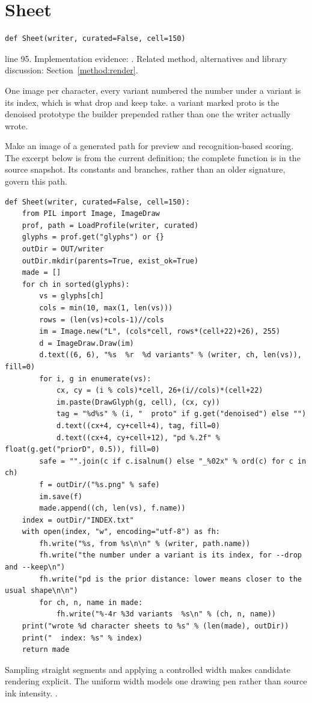 \section{Sheet}\label{fn:curate:Sheet}
\begin{lstlisting}[style=sig]
def Sheet(writer, curated=False, cell=150)
\end{lstlisting}
 line 95. Implementation evidence: \cite{code2026}. Related method, alternatives and library discussion: Section~\ref{method:render}.


One image per character, every variant numbered the number under a variant is its index, which is what drop and keep take.  a variant marked proto is the denoised prototype the builder prepended rather than one the writer actually wrote.


Make an image of a generated path for preview and recognition-based scoring. The excerpt below is from the current definition; the complete function is in the source snapshot. Its constants and branches, rather than an older signature, govern this path.


\begin{lstlisting}[style=plain]
def Sheet(writer, curated=False, cell=150):
    from PIL import Image, ImageDraw
    prof, path = LoadProfile(writer, curated)
    glyphs = prof.get("glyphs") or {}
    outDir = OUT/writer
    outDir.mkdir(parents=True, exist_ok=True)
    made = []
    for ch in sorted(glyphs):
        vs = glyphs[ch]
        cols = min(10, max(1, len(vs)))
        rows = (len(vs)+cols-1)//cols
        im = Image.new("L", (cols*cell, rows*(cell+22)+26), 255)
        d = ImageDraw.Draw(im)
        d.text((6, 6), "%s  %r  %d variants" % (writer, ch, len(vs)), fill=0)
        for i, g in enumerate(vs):
            cx, cy = (i % cols)*cell, 26+(i//cols)*(cell+22)
            im.paste(DrawGlyph(g, cell), (cx, cy))
            tag = "%d%s" % (i, "  proto" if g.get("denoised") else "")
            d.text((cx+4, cy+cell+4), tag, fill=0)
            d.text((cx+4, cy+cell+12), "pd %.2f" % float(g.get("priorD", 0.5)), fill=0)
        safe = "".join(c if c.isalnum() else "_%02x" % ord(c) for c in ch)
        f = outDir/("%s.png" % safe)
        im.save(f)
        made.append((ch, len(vs), f.name))
    index = outDir/"INDEX.txt"
    with open(index, "w", encoding="utf-8") as fh:
        fh.write("%s, from %s\n\n" % (writer, path.name))
        fh.write("the number under a variant is its index, for --drop and --keep\n")
        fh.write("pd is the prior distance: lower means closer to the usual shape\n\n")
        for ch, n, name in made:
            fh.write("%-4r %3d variants  %s\n" % (ch, n, name))
    print("wrote %d character sheets to %s" % (len(made), outDir))
    print("  index: %s" % index)
    return made
\end{lstlisting}
Sampling straight segments and applying a controlled width makes candidate rendering explicit. The uniform width models one drawing pen rather than source ink intensity. \cite{pillowdraw,opencvdraw,code2026}.

